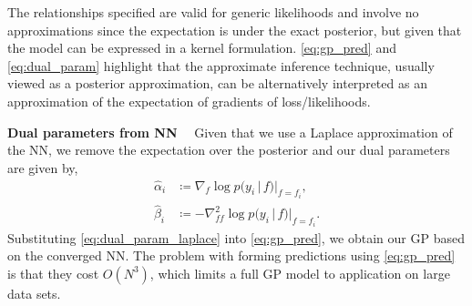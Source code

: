 \documentclass{article}
\renewcommand{\paragraph}[1]{{\bf #1}~~}
\renewcommand{\mid}{\,|\,}
\begin{document}
%
The relationships specified are valid for generic likelihoods and involve no approximations since the expectation is under the exact posterior, but given that the model can be expressed in a kernel formulation. \cref{eq:gp_pred} and \cref{eq:dual_param} highlight that the approximate inference technique, usually viewed as a posterior approximation, can be alternatively interpreted as an approximation of the expectation of gradients of loss/likelihoods.


\paragraph{Dual parameters from NN}
Given that we use a Laplace approximation of the NN, we remove the expectation over the posterior \citep[see Ch.~3.4.1 in][for derivation]{rasmussen2006gaussian} and our dual parameters are given by,
%
\begin{subequations}
\label{eq:dual_param_laplace}
\begin{align}
  \hat{\alpha}_i &\coloneqq \nabla_{f}\log p(y_i \mid f) |_{f=f_i} , \\
  \hat{\beta}_i &\coloneqq - \nabla^2_{ff}\log p(y_i \mid f) |_{f=f_i}.
  \end{align}
\end{subequations}
%
Substituting \cref{eq:dual_param_laplace} into \cref{eq:gp_pred}, we obtain our GP based on the converged NN. The problem with forming predictions using \cref{eq:gp_pred} is that they cost $O(N^3)$, which limits a full GP model to application on large data sets.
\end{document}
